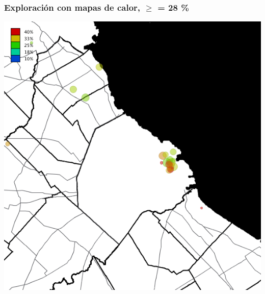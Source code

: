 \documentclass[xcolor=x11names]{beamer}
\begin{document}
\begin{frame}
	\frametitle{Exploración con mapas de calor, $\geq$ = 28 \%}
	\centering
	\includegraphics[height=.9\textheight,width = .9\columnwidth,keepaspectratio]
	{slides/201112_hi_res_amba_usuarios_proporcion_circulos_beta28.png}
\end{frame}

%
%
%
%
\end{document}
